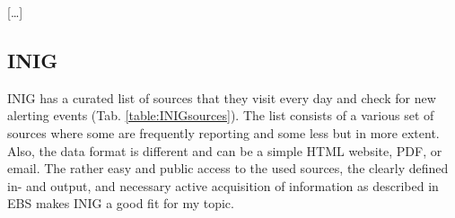   [\dots]

\subsection{INIG}\label{INIGsources}
  INIG has a curated list of sources that they visit every day and check for new alerting events (Tab. \ref{table:INIGsources}).
  The list consists of a various set of sources where some are frequently reporting and some less but in more extent.
  Also, the data format is different and can be a simple HTML website, PDF, or email.
  The rather easy and public access to the used sources, the clearly defined in- and output, and necessary active acquisition of information as described in EBS makes INIG a good fit for my topic.




